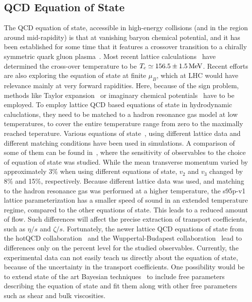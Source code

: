 \subsection{QCD Equation of State}
The QCD equation of state, accessible in high-energy collisions (and in 
  the region around mid-rapidity) is that at vanishing baryon chemical 
  potential, and it has been established for some time that it features 
  a crossover transition to a chirally symmetric quark gluon plasma~\cite{Aoki:2006we}. 
Most recent lattice calculations~\cite{Steinbrecher:2018phh} have determined 
  the cross-over temperature to be $T_c\simeq 156.5 \pm 1.5\,{\rm MeV}$. 
Recent efforts are also exploring the equation of state at finite $\mu_B$, 
  which at LHC would have relevance mainly at very forward rapidities. 
Here, because of the sign problem, methods like Taylor expansion~\cite{Kaczmarek:2011zz,Endrodi:2011gv,Bazavov:2015zja,Bonati:2018nut} 
  or imaginary chemical potentials~\cite{Cea:2014xva,Bonati:2014kpa,Bonati:2015bha,Bellwied:2015rza,Cea:2015cya} 
  have to be employed. 
To employ lattice QCD based equations of state in hydrodynamic caluclations, 
  they need to be matched to a hadron resonance gas model at low temperatures, 
  to cover the entire temperature range from zero to the maximally 
  reached teperature. 
Various equations of state~\cite{Huovinen:2009yb, Borsanyi:2013bia, Bazavov:2014pvz}, 
  using different lattice data and different matching conditions have been used 
  in simulations. 
A comparison of some of them can be found in~\cite{Moreland:2015dvc}, where 
  the sensitivity of observables to the choice of equation of state 
  was studied. 
While the mean transverse momentum varied by approximately 3\% when using 
  different equations of state, $v_2$ and $v_3$ changed by 8\% and 15\%, 
  respectively.
Because different lattice data was used, and matching to the hadron resonance 
  gas was performed at a higher temperature, the s95p-v1 lattice 
  parameterization has a smaller speed of sound in an extended temperature 
  regime, compared to the other equations of state. 
This leads to a reduced amount of flow. 
Such differences will affect the precise extraction of transport coefficients, 
  such as $\eta/s$ and $\zeta/s$. 
Fortunately, the newer lattice QCD equations of state from the hotQCD 
  collaboration~\cite{Bazavov:2014pvz} and the Wuppertal-Budapest 
  collaboration~\cite{Borsanyi:2013bia} lead to differences only on the 
  percent level for the studied observables.
Currently, the experimental data can not easily teach us directly about 
  the equation of state, because of the uncertainty in the transport 
  coefficients. 
One possibility would be to extend state of the art Bayesian techniques~\cite{Moreland:2018gsh} 
  to include free parameters describing the equation of state and fit them 
  along with other free parameters such as shear and bulk viscosities. 



